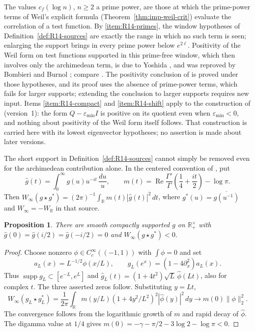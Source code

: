 \documentclass[11pt]{amsart}
\theoremstyle{plain}
\newtheorem{proposition}[theorem]{Proposition}
\theoremstyle{definition}
\theoremstyle{remark}
\numberwithin{equation}{section}
\newcommand{\R}{\mathbb{R}}
\DeclareMathOperator{\Rea}{Re}
\renewcommand{\Re}{\Rea}
\begin{document}
The values $c_f(\log n)$, $n\ge2$ a prime power, are those at which the
prime-power terms of Weil's explicit formula
(Theorem~\ref{thm:imp-weil-crit}) evaluate the correlation of a test
function. By \ref{item:R14-primes}, the window hypotheses of
Definition~\ref{def:R14-sources} are exactly the range in which no such
term is seen; enlarging the support brings in every prime power below
$e^{2\ell}$. Positivity of the Weil form on test functions supported in
this prime-free window, which then involves only the archimedean term,
is due to Yoshida \cite[Theorem~1, p.~310]{Yoshida1992Hermitian}, and
was reproved by Bombieri \cite[\S12, Theorem~12, pp.~226--227]%
{Bombieri2000Lincei} and Burnol \cite[Theorem, p.~2]{Burnol2000Explicites};
compare \cite[p.~2 and (149), p.~50]{ConnesConsani2020WeilPositivity}.
The positivity conclusion of
\cite[Theorem~1]{ConnesConsani2020WeilPositivity} is proved under those
hypotheses, and its proof uses the absence of prime-power terms, which
fails for larger supports; extending the conclusion to larger supports
requires new input. Items \ref{item:R14-compact}
and \ref{item:R14-shift} apply to the
construction of \cite[Theorem~5.10]{ConnesConsaniMoscovici2025ZetaTriples}
(version~1): the form $Q-\varepsilon_{\min}I$ is positive on its
quotient even when $\varepsilon_{\min}<0$, and nothing about positivity
of the Weil form itself follows. That construction is carried here with
its lowest eigenvector hypotheses; no assertion is made about later
versions.

The short support in Definition~\ref{def:R14-sources} cannot simply be
removed even for the archimedean contribution alone. In the centered
convention of \cite[(152)--(153), Appendix~B]%
{ConnesConsani2020WeilPositivity}, put
\[
\widehat g(t)=\int_0^\infty g(u)u^{-it}\,\frac{du}{u},\qquad
m(t)=\Re\frac{\Gamma'}{\Gamma}
  \left(\frac14+\frac{it}{2}\right)-\log\pi.
\]
Then $W_\infty(g\star g^*)=(2\pi)^{-1}
\int_\R m(t)|\widehat g(t)|^2\,dt$, where
$g^*(u)=\overline{g(u^{-1})}$ and $W_\infty=-W_\R$ in that source.

\begin{proposition}\label{prop:arch-window-limit}
There are smooth compactly supported $g$ on $\R_+^\times$ with
$\widehat g(0)=\widehat g(i/2)=\widehat g(-i/2)=0$ and
$W_\infty(g\star g^*)<0$.
\end{proposition}

\begin{proof}
Choose nonzero $\phi\in C_c^\infty((-1,1))$ with $\int\phi=0$ and set
\[
a_L(x)=L^{-1/2}\phi(x/L),\qquad
g_L(e^x)=(1-4\partial_x^2)a_L(x).
\]
Thus $\operatorname{supp}g_L\subset[e^{-L},e^L]$ and
$\widehat g_L(t)=(1+4t^2)\sqrt L\,\widehat\phi(Lt)$, also for
complex $t$. The three asserted zeros follow. Substituting $y=Lt$,
\[
W_\infty(g_L\star g_L^*)=\frac1{2\pi}\int_\R
m(y/L)(1+4y^2/L^2)^2|\widehat\phi(y)|^2\,dy
\longrightarrow m(0)\|\phi\|_2^2.
\]
The convergence follows from the logarithmic growth of $m$ and rapid
decay of $\widehat\phi$. The digamma value at $1/4$ gives
$m(0)=-\gamma-\pi/2-3\log2-\log\pi<0$.
\end{proof}
\end{document}
